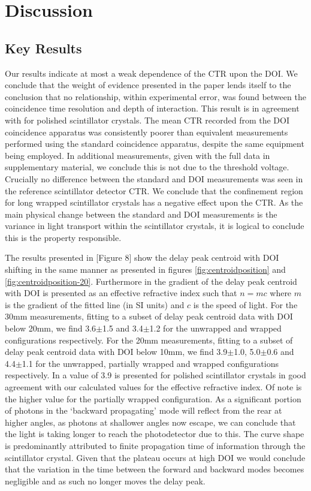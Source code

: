 \section{Discussion}
\label{sec:discussion}
\subsection{Key Results}
Our results indicate at most a weak dependence of the CTR upon the DOI. We conclude that the weight of evidence presented in the paper lends itself to the conclusion that no relationship, within experimental error, was found between the coincidence time resolution and depth of interaction. This result is in agreement with \cite{Bircher_Shao_2012} for polished scintillator crystals. The mean CTR recorded from the DOI coincidence apparatus was consistently poorer than equivalent measurements performed using the standard coincidence apparatus, despite the same equipment being employed. In additional measurements, given with the full data in supplementary material, we conclude this is not due to the threshold voltage. Crucially no difference between the standard and DOI measurements was seen in the reference scintillator detector CTR. We conclude that the confinement region for long wrapped scintillator crystals has a negative effect upon the CTR. As the main physical change between the standard and DOI measurements is the variance in light transport within the scintillator crystals, it is logical to conclude this is the property responsible.

The results presented in [Figure 8]\cite{Moses_Derenzo_1999} show the delay peak centroid with DOI shifting in the same manner as presented in figures \ref{fig:centroidposition} and \ref{fig:centroidposition-20}. Furthermore in \cite{Moses_Derenzo_1999} the gradient of  the delay peak centroid with DOI is presented as an effective refractive index such that $n=mc$ where $m$ is the gradient of the fitted line (in SI units) and $c$ is the speed of light. For the 30mm measurements, fitting to a subset of delay peak centroid data with DOI below 20mm, we find 3.6$\pm$1.5 and 3.4$\pm$1.2 for the unwrapped and wrapped configurations respectively.  For the 20mm measurements, fitting to a subset of delay peak centroid data with DOI below 10mm, we find 3.9$\pm$1.0, 5.0$\pm$0.6 and 4.4$\pm$1.1 for the unwrapped, partially wrapped and wrapped configurations respectively. In \cite{Moses_Derenzo_1999} a value of 3.9 is presented for polished scintillator crystals in good agreement with our calculated values for the effective refractive index. Of note is the higher value for the partially wrapped configuration. As a significant portion of photons in the `backward propagating' mode will reflect from the rear at higher angles, as photons at shallower angles now escape, we can conclude that the light is taking longer to reach the photodetector due to this. The curve shape is predominantly attributed to finite propagation time of information through the scintillator crystal. Given that the plateau occurs at high DOI we would conclude that the variation in the time between the forward and backward modes becomes negligible and as such no longer moves the delay peak.

